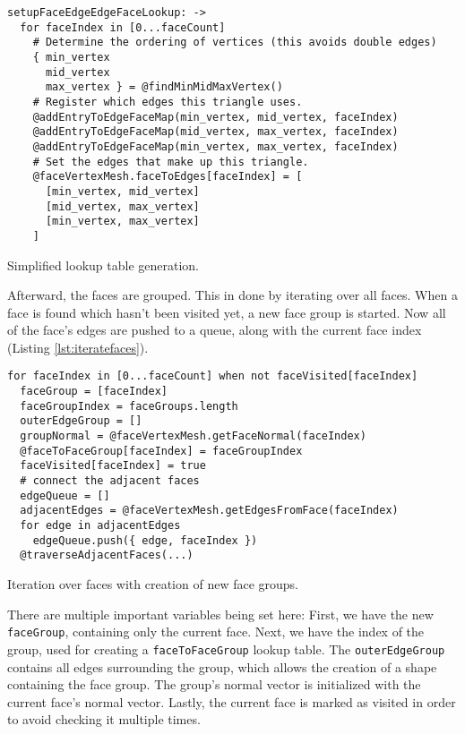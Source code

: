 \documentclass[../ClassicThesis.tex]{subfiles}
\begin{document}
\begin{listing}[ht]
\begin{verbatim}
setupFaceEdgeEdgeFaceLookup: ->
  for faceIndex in [0...faceCount]
    # Determine the ordering of vertices (this avoids double edges)
    { min_vertex
      mid_vertex
      max_vertex } = @findMinMidMaxVertex()
    # Register which edges this triangle uses.
    @addEntryToEdgeFaceMap(min_vertex, mid_vertex, faceIndex)
    @addEntryToEdgeFaceMap(mid_vertex, max_vertex, faceIndex)
    @addEntryToEdgeFaceMap(min_vertex, max_vertex, faceIndex)
    # Set the edges that make up this triangle.
    @faceVertexMesh.faceToEdges[faceIndex] = [
      [min_vertex, mid_vertex]
      [mid_vertex, max_vertex]
      [min_vertex, max_vertex]
    ]
\end{verbatim}
\caption{Simplified lookup table generation.}
\label{lst:lookuptables}
\end{listing}

Afterward, the faces are grouped. This in done by iterating over all faces. When a face is found which hasn't been visited yet, a new face group is started. Now all of the face's edges are pushed to a queue, along with the current face index (Listing \ref{lst:iteratefaces}).

\begin{listing}[ht]
\begin{verbatim}
for faceIndex in [0...faceCount] when not faceVisited[faceIndex]
  faceGroup = [faceIndex]
  faceGroupIndex = faceGroups.length
  outerEdgeGroup = []
  groupNormal = @faceVertexMesh.getFaceNormal(faceIndex)
  @faceToFaceGroup[faceIndex] = faceGroupIndex
  faceVisited[faceIndex] = true
  # connect the adjacent faces
  edgeQueue = []
  adjacentEdges = @faceVertexMesh.getEdgesFromFace(faceIndex)
  for edge in adjacentEdges
    edgeQueue.push({ edge, faceIndex })
  @traverseAdjacentFaces(...)
\end{verbatim}
\caption{Iteration over faces with creation of new face groups.}
\label{lst:iteratefaces}
\end{listing}

There are multiple important variables being set here: First, we have the new \texttt{faceGroup}, containing only the current face. Next, we have the index of the group, used for creating a \texttt{faceToFaceGroup} lookup table. The \texttt{outerEdgeGroup} contains all edges surrounding the group, which allows the creation of a shape containing the face group. The group's normal vector is initialized with the current face's normal vector. Lastly, the current face is marked as visited in order to avoid checking it multiple times.
\end{document}
